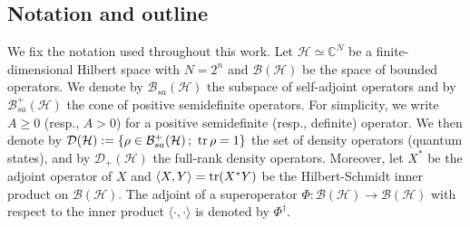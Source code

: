 \documentclass[10pt]{article}  %
\theoremstyle{plain}
\numberwithin{equation}{section}
\newcommand{\innerp}[1]{\langle{#1}\rangle}
\def\C{\mathbb{C}}
\newcommand{\bh}{\mathbf{h}}
\newcommand{\mc}[1]{\mathcal{#1}}
\renewcommand{\C}{\mathbb{C}}
\def \bh {\mc{B}(\mc{H})}
\def \l {\langle}
\def \r {\rangle}
\def \dd {\cdot}
\begin{document}
%

\subsection*{Notation and outline}
We fix the notation used throughout this work. Let $\mc{H}\simeq \C^N$ be a finite-dimensional Hilbert space with $N = 2^n$ and $\mc{B}(\mc{H})$ be the space of bounded operators. We denote by $\mc{B}_{sa}(\mc{H})$ the subspace of self-adjoint operators and by $\mc{B}^{+}_{sa}(\mc{H})$ the cone of positive semidefinite operators. For simplicity, we write $A \ge 0$ (resp., $A > 0$) for a positive semidefinite (resp., definite) operator. We then denote by $\mc{D}(\mc{H}) := \{\rho \in \mc{B}_{sa}^+(\mc{H})\,;\  \tr \rho =1 \}$ the set of density operators (quantum states), and by $\mc{D}_+(\mc{H})$ the full-rank density operators. Moreover, let $X^*$ be the adjoint operator of $X$ and $\l X, Y\r = \tr (X^*Y)$ be the Hilbert-Schmidt inner product on $\bh$. 
The adjoint of a superoperator $\Phi: \mc{B}(\mc{H}) \to \mc{B}(\mc{H})$ with respect to the inner product $\l \dd,\dd \r $ is denoted by $\Phi^\dag$. 
\end{document}

